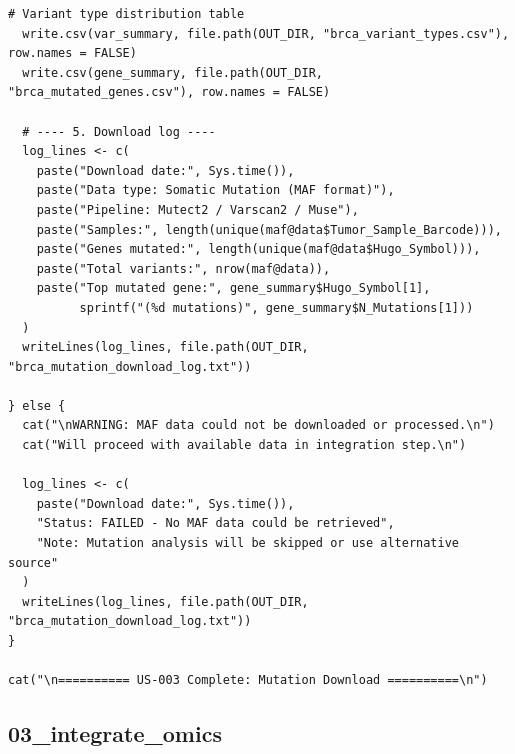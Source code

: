 \documentclass[12pt,a4paper]{ctexart}
\begin{document}
\begin{lstlisting}[caption={02_download_mutations}, basicstyle=\ttfamily\scriptsize]
  # Variant type distribution table
  write.csv(var_summary, file.path(OUT_DIR, "brca_variant_types.csv"), row.names = FALSE)
  write.csv(gene_summary, file.path(OUT_DIR, "brca_mutated_genes.csv"), row.names = FALSE)

  # ---- 5. Download log ----
  log_lines <- c(
    paste("Download date:", Sys.time()),
    paste("Data type: Somatic Mutation (MAF format)"),
    paste("Pipeline: Mutect2 / Varscan2 / Muse"),
    paste("Samples:", length(unique(maf@data$Tumor_Sample_Barcode))),
    paste("Genes mutated:", length(unique(maf@data$Hugo_Symbol))),
    paste("Total variants:", nrow(maf@data)),
    paste("Top mutated gene:", gene_summary$Hugo_Symbol[1],
          sprintf("(%d mutations)", gene_summary$N_Mutations[1]))
  )
  writeLines(log_lines, file.path(OUT_DIR, "brca_mutation_download_log.txt"))

} else {
  cat("\nWARNING: MAF data could not be downloaded or processed.\n")
  cat("Will proceed with available data in integration step.\n")

  log_lines <- c(
    paste("Download date:", Sys.time()),
    "Status: FAILED - No MAF data could be retrieved",
    "Note: Mutation analysis will be skipped or use alternative source"
  )
  writeLines(log_lines, file.path(OUT_DIR, "brca_mutation_download_log.txt"))
}

cat("\n========== US-003 Complete: Mutation Download ==========\n")
\end{lstlisting}

\subsection{03_integrate_omics}
\end{document}
